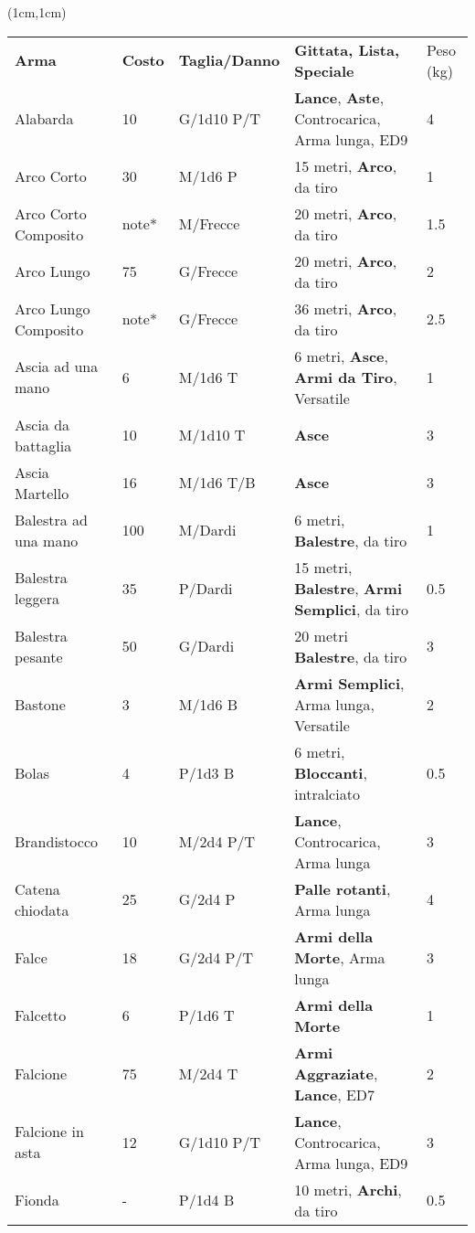 \documentclass[a4paper,12 pt,openany]{book}
\begin{document}
	\begin{textblock*}{19.5cm}(1cm,1cm) %
		\footnotesize
		\begin{tabular}{lllll}
\textbf{Arma}&\textbf{Costo}&\textbf{Taglia/Danno} & \textbf{Gittata, Lista, Speciale} & Peso (kg)\\

Alabarda& 10 & G/1d10 P/T& \textbf{Lance}, \textbf{Aste}, Controcarica, Arma lunga, ED9 & 4\\
Arco Corto& 30 & M/1d6 P& 15 metri, \textbf{Arco}, da tiro& 1\\
Arco Corto Composito& note*& M/Frecce& 20 metri, \textbf{Arco}, da tiro& 1.5\\
Arco Lungo& 75 & G/Frecce& 20 metri, \textbf{Arco}, da tiro& 2\\
Arco Lungo Composito& note*& G/Frecce& 36 metri, \textbf{Arco}, da tiro& 2.5\\
Ascia ad una mano& 6  & M/1d6 T& 6 metri, \textbf{Asce}, \textbf{Armi da Tiro}, Versatile& 1\\
Ascia da battaglia& 10 & M/1d10 T&\textbf{Asce}& 3\\
Ascia Martello& 16 & M/1d6 T/B& \textbf{Asce}& 3\\
Balestra ad una mano& 100& M/Dardi& 6 metri, \textbf{Balestre}, da tiro& 1\\
Balestra leggera& 35 & P/Dardi& 15 metri, \textbf{Balestre}, \textbf{Armi Semplici}, da tiro& 0.5\\
Balestra pesante& 50 & G/Dardi& 20 metri \textbf{Balestre}, da tiro& 3\\
Bastone& 3& M/1d6 B& \textbf{Armi Semplici}, Arma lunga, Versatile& 2\\
Bolas& 4& P/1d3 B&6 metri, \textbf{Bloccanti}, intralciato& 0.5\\
Brandistocco& 10 & M/2d4 P/T& \textbf{Lance}, Controcarica, Arma lunga& 3\\
Catena chiodata& 25 & G/2d4 P& \textbf{Palle rotanti}, Arma lunga& 4\\
Falce& 18 & G/2d4 P/T& \textbf{Armi della Morte}, Arma lunga& 3\\
Falcetto& 6& P/1d6 T& \textbf{Armi della Morte} & 1\\
Falcione& 75 & M/2d4 T& \textbf{Armi Aggraziate}, \textbf{Lance}, ED7& 2\\
Falcione in asta& 12 & G/1d10 P/T& \textbf{Lance}, Controcarica, Arma lunga, ED9& 3\\
Fionda& -& P/1d4 B& 10 metri, \textbf{Archi}, da tiro& 0.5\\

\end{tabular}
\end{textblock*}
\end{document}
